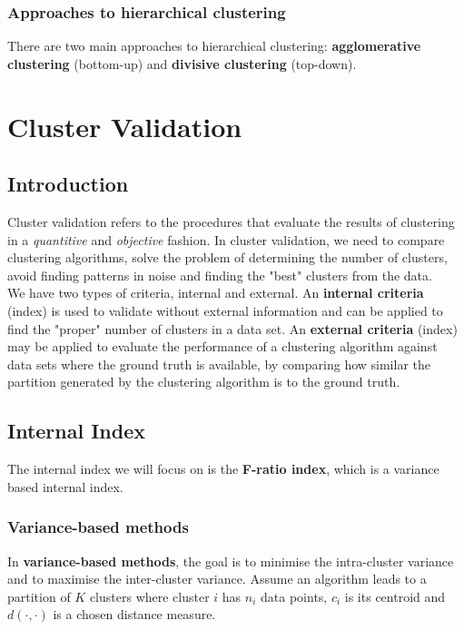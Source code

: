 \documentclass[11pt,fleqn]{book} %
\begin{document}
\subsection*{Approaches to hierarchical clustering}
There are two main approaches to hierarchical clustering: \textbf{agglomerative clustering} (bottom-up) and \textbf{divisive clustering} (top-down). 



\chapter{Cluster Validation}
\section*{Introduction}
Cluster validation refers to the procedures that evaluate the results of clustering in a \textit{quantitive} and \textit{objective} fashion. In cluster validation, we need to compare clustering algorithms, solve the problem of determining the number of clusters, avoid finding patterns in noise and finding the "best" clusters from the data.\\

\noindent
We have two types of criteria, internal and external. An \textbf{internal criteria} (index) is used to validate without external information and can be applied to find the "proper" number of clusters in a data set. An \textbf{external criteria} (index) may be applied to evaluate the performance of a clustering algorithm against data sets where the ground truth is available, by comparing how similar the partition generated by the clustering algorithm is to the ground truth.

\section{Internal Index}
The internal index we will focus on is the \textbf{F-ratio index}, which is a variance based internal index.

\subsection*{Variance-based methods}
In \textbf{variance-based methods}, the goal is to minimise the intra-cluster variance and to maximise the inter-cluster variance. Assume an algorithm leads to a partition of $K$ clusters where cluster $i$ has $n_i$ data points, $c_i$ is its centroid and $d(\cdot,\cdot)$ is a chosen distance measure.
\end{document}
